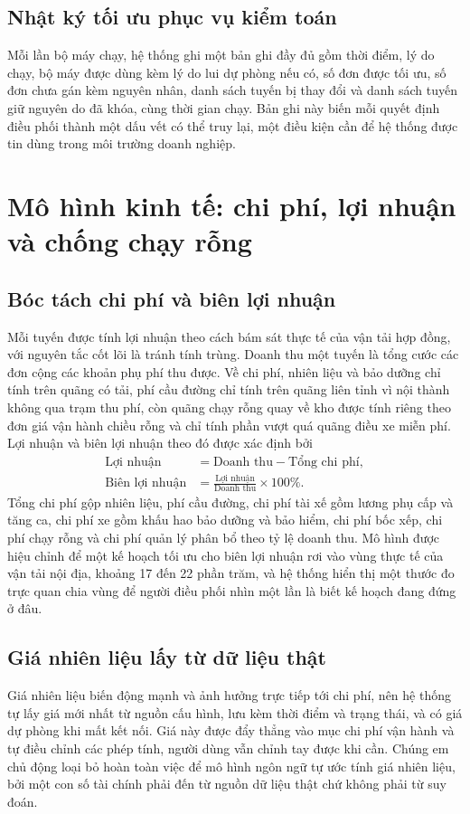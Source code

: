 \documentclass[12pt,a4paper,oneside]{report}
\begin{document}
\section{Nhật ký tối ưu phục vụ kiểm toán}
Mỗi lần bộ máy chạy, hệ thống ghi một bản ghi đầy đủ gồm thời điểm, lý do chạy, bộ máy được dùng kèm lý do lui dự phòng nếu có, số đơn được tối ưu, số đơn chưa gán kèm nguyên nhân, danh sách tuyến bị thay đổi và danh sách tuyến giữ nguyên do đã khóa, cùng thời gian chạy. Bản ghi này biến mỗi quyết định điều phối thành một dấu vết có thể truy lại, một điều kiện cần để hệ thống được tin dùng trong môi trường doanh nghiệp.

\chapter{Mô hình kinh tế: chi phí, lợi nhuận và chống chạy rỗng}

\section{Bóc tách chi phí và biên lợi nhuận}
Mỗi tuyến được tính lợi nhuận theo cách bám sát thực tế của vận tải hợp đồng, với nguyên tắc cốt lõi là tránh tính trùng. Doanh thu một tuyến là tổng cước các đơn cộng các khoản phụ phí thu được. Về chi phí, nhiên liệu và bảo dưỡng chỉ tính trên quãng có tải, phí cầu đường chỉ tính trên quãng liên tỉnh vì nội thành không qua trạm thu phí, còn quãng chạy rỗng quay về kho được tính riêng theo đơn giá vận hành chiều rỗng và chỉ tính phần vượt quá quãng điều xe miễn phí. Lợi nhuận và biên lợi nhuận theo đó được xác định bởi
\begin{align}
\text{Lợi nhuận} &= \text{Doanh thu} - \text{Tổng chi phí}, \\
\text{Biên lợi nhuận} &= \frac{\text{Lợi nhuận}}{\text{Doanh thu}} \times 100\%.
\end{align}
Tổng chi phí gộp nhiên liệu, phí cầu đường, chi phí tài xế gồm lương phụ cấp và tăng ca, chi phí xe gồm khấu hao bảo dưỡng và bảo hiểm, chi phí bốc xếp, chi phí chạy rỗng và chi phí quản lý phân bổ theo tỷ lệ doanh thu. Mô hình được hiệu chỉnh để một kế hoạch tối ưu cho biên lợi nhuận rơi vào vùng thực tế của vận tải nội địa, khoảng 17 đến 22 phần trăm, và hệ thống hiển thị một thước đo trực quan chia vùng để người điều phối nhìn một lần là biết kế hoạch đang đứng ở đâu.

\section{Giá nhiên liệu lấy từ dữ liệu thật}
Giá nhiên liệu biến động mạnh và ảnh hưởng trực tiếp tới chi phí, nên hệ thống tự lấy giá mới nhất từ nguồn cấu hình, lưu kèm thời điểm và trạng thái, và có giá dự phòng khi mất kết nối. Giá này được đẩy thẳng vào mục chi phí vận hành và tự điều chỉnh các phép tính, người dùng vẫn chỉnh tay được khi cần. Chúng em chủ động loại bỏ hoàn toàn việc để mô hình ngôn ngữ tự ước tính giá nhiên liệu, bởi một con số tài chính phải đến từ nguồn dữ liệu thật chứ không phải từ suy đoán.
\end{document}
